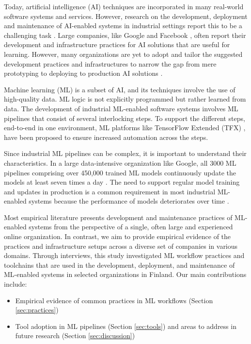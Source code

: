 Today, artificial intelligence (AI) techniques are incorporated in many real-world software systems and services. However, research on the development, deployment and maintenance of AI-enabled systems in industrial settings report this to be a challenging task \cite{Sculley2015, Lwakatare2019}. Large companies, like Google \cite{Baylor2017} and Facebook \cite{Hazelwood2018Facebook}, often report their development and infrastructure practices for AI solutions that are useful for learning. However, many organizations are yet to adopt and tailor the suggested development practices and infrastructures to narrow the gap from mere prototyping to deploying to production AI solutions \cite{Serban2020Practices}. 

Machine learning (ML) is a subset of AI, and its techniques involve the use of high-quality data. ML logic is not explicitly programmed but rather learned from data. The development of industrial ML-enabled software systems involves ML pipelines that consist of several interlocking steps. To support the different steps, end-to-end in one environment, ML platforms like TensorFlow Extended (TFX) \cite{Baylor2017}, have been proposed to ensure increased automation across the steps.

Since industrial ML pipelines can be complex, it is important to understand their characteristics. In a large data-intensive organization like Google, all 3000 ML pipelines comprising over 450,000 trained ML models continuously update the models at least seven times a day \cite{Doris2021MLPipelines}. %
The need to support regular model training and updates in production is a common requirement in most industrial ML-enabled systems because
the performance of models deteriorates over time \cite{Sculley2015}.

Most empirical literature presents development and maintenance practices of ML-enabled systems from the perspective of a single, often large and experienced online organization. In contrast, we aim to provide empirical evidence of the practices and infrastructure setups across a diverse set of companies in various domains. Through interviews, this study investigated ML workflow practices and toolchains that are used in the development, deployment, and maintenance of ML-enabled systems in selected organizations in Finland. Our main contributions include:
\begin{itemize}
    \item Empirical evidence of common practices in ML workflows (Section \ref{sec:practices})
    \item Tool adoption in ML pipelines (Section \ref{sec:tools}) and areas to address in future research (Section \ref{sec:discussion})
    
\end{itemize}

